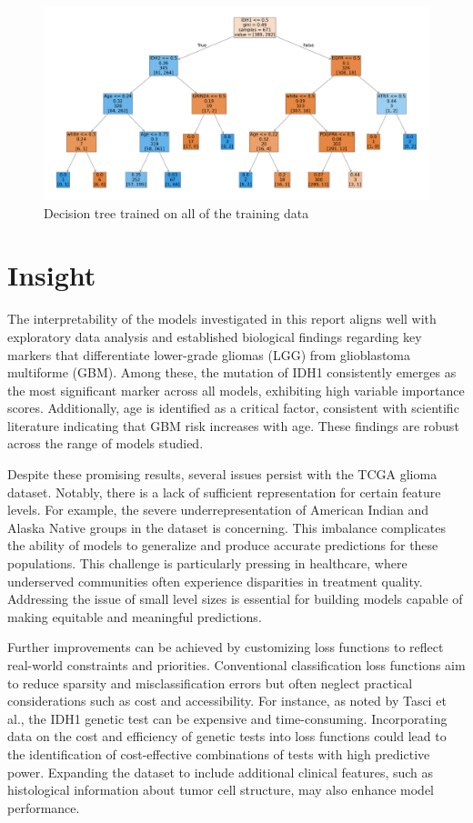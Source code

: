 \documentclass[12pt]{article}
\newtheorem{Proof of Lemma}{Proof of Lemma}
\begin{document}
\begin{figure}[h!]
  \centering
  \includegraphics[scale = 0.2]{decision-tree.png}
  \caption{Decision tree trained on all of the training data}
  \label{fig:dtree-plot}
\end{figure}


\newpage
\section{Insight}
The interpretability of the models investigated in this report aligns well with exploratory data analysis and established biological findings regarding key markers that differentiate lower-grade gliomas (LGG) from glioblastoma multiforme (GBM). Among these, the mutation of IDH1 consistently emerges as the most significant marker across all models, exhibiting high variable importance scores. Additionally, age is identified as a critical factor, consistent with scientific literature indicating that GBM risk increases with age. These findings are robust across the range of models studied.

Despite these promising results, several issues persist with the TCGA glioma dataset. Notably, there is a lack of sufficient representation for certain feature levels. For example, the severe underrepresentation of American Indian and Alaska Native groups in the dataset is concerning. This imbalance complicates the ability of models to generalize and produce accurate predictions for these populations. This challenge is particularly pressing in healthcare, where underserved communities often experience disparities in treatment quality. Addressing the issue of small level sizes is essential for building models capable of making equitable and meaningful predictions.

Further improvements can be achieved by customizing loss functions to reflect real-world constraints and priorities. Conventional classification loss functions aim to reduce sparsity and misclassification errors but often neglect practical considerations such as cost and accessibility. For instance, as noted by Tasci et al., the IDH1 genetic test can be expensive and time-consuming. Incorporating data on the cost and efficiency of genetic tests into loss functions could lead to the identification of cost-effective combinations of tests with high predictive power. Expanding the dataset to include additional clinical features, such as histological information about tumor cell structure, may also enhance model performance.
\end{document}
